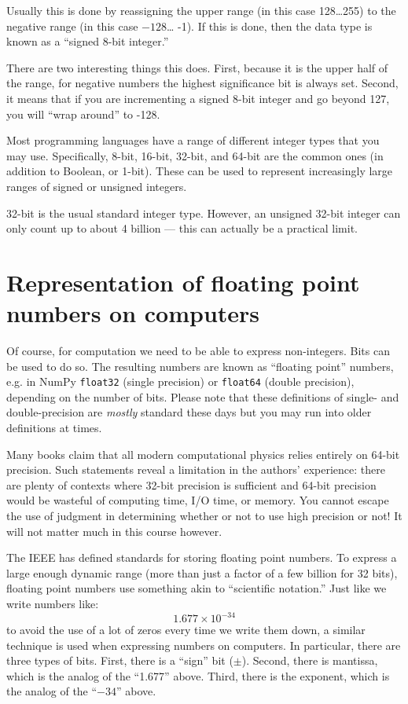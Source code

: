 
\begin{answer}
  Usually this is done by reassigning the upper range (in this
  case 128\ldots 255) to the negative range (in this case $-128$\ldots
  -1). If this is done, then the data type is known as a ``signed
  8-bit integer.''

  There are two interesting things this does. First, because it is the
  upper half of the range, for negative numbers the highest
  significance bit is always set. Second, it means that if you are
  incrementing a signed 8-bit integer and go beyond 127, you will
  ``wrap around'' to -128.
\end{answer}

Most programming languages have a range of different integer types
that you may use. Specifically, 8-bit, 16-bit, 32-bit, and 64-bit are
the common ones (in addition to Boolean, or 1-bit).  These can be used
to represent increasingly large ranges of signed or unsigned integers.

32-bit is the usual standard integer type. However, an unsigned 32-bit
integer can only count up to about 4 billion --- this can actually be
a practical limit. 

\section{Representation of floating point numbers on computers}

Of course, for computation we need to be able to express
non-integers. Bits can be used to do so. The resulting numbers are
known as ``floating point'' numbers, e.g. in NumPy {\tt float32}
(single precision) or {\tt float64} (double precision), depending on
the number of bits. Please note that these definitions of single- and
double-precision are {\it mostly} standard these days but you may run
into older definitions at times.

Many books claim that all modern computational physics relies entirely
on 64-bit precision. Such statements reveal a limitation in the
authors' experience: there are plenty of contexts where 32-bit
precision is sufficient and 64-bit precision would be wasteful of
computing time, I/O time, or memory. You cannot escape the use of
judgment in determining whether or not to use high precision or not!
It will not matter much in this course however.

The IEEE has defined standards for storing floating point numbers.  To
express a large enough dynamic range (more than just a factor of a few
billion for 32 bits), floating point numbers use something akin to
``scientific notation.'' Just like we write numbers like:
\begin{equation}
1.677 \times 10^{-34}
\end{equation}
to avoid the use of a lot of zeros every time we write them down, a
similar technique is used when expressing numbers on computers. In
particular, there are three types of bits. First, there is a ``sign''
bit ($\pm$). Second, there is mantissa, which is the analog of the
``1.677'' above. Third, there is the exponent, which is the analog of
the ``$-34$'' above.


